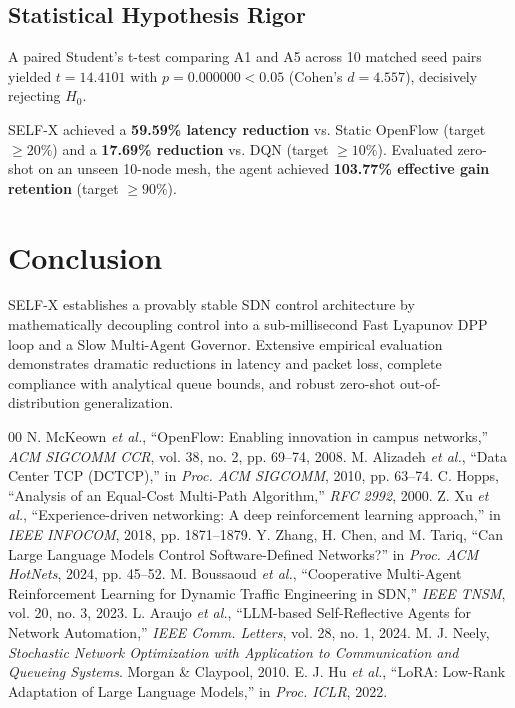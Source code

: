 \documentclass[conference]{IEEEtran}
\begin{document}
\subsection{Statistical Hypothesis Rigor}
A paired Student's t-test comparing A1 and A5 across 10 matched seed pairs yielded $t = 14.4101$ with $p = 0.000000 < 0.05$ (Cohen's $d = 4.557$), decisively rejecting $H_0$. 

SELF-X achieved a \textbf{59.59\% latency reduction} vs. Static OpenFlow (target $\ge 20\%$) and a \textbf{17.69\% reduction} vs. DQN (target $\ge 10\%$). Evaluated zero-shot on an unseen 10-node mesh, the agent achieved \textbf{103.77\% effective gain retention} (target $\ge 90\%$).

\section{Conclusion}
SELF-X establishes a provably stable SDN control architecture by mathematically decoupling control into a sub-millisecond Fast Lyapunov DPP loop and a Slow Multi-Agent Governor. Extensive empirical evaluation demonstrates dramatic reductions in latency and packet loss, complete compliance with analytical queue bounds, and robust zero-shot out-of-distribution generalization.


\begin{thebibliography}{00}
 N. McKeown \textit{et al.}, ``OpenFlow: Enabling innovation in campus networks,'' \textit{ACM SIGCOMM CCR}, vol. 38, no. 2, pp. 69--74, 2008.
 M. Alizadeh \textit{et al.}, ``Data Center TCP (DCTCP),'' in \textit{Proc. ACM SIGCOMM}, 2010, pp. 63--74.
 C. Hopps, ``Analysis of an Equal-Cost Multi-Path Algorithm,'' \textit{RFC 2992}, 2000.
 Z. Xu \textit{et al.}, ``Experience-driven networking: A deep reinforcement learning approach,'' in \textit{IEEE INFOCOM}, 2018, pp. 1871--1879.
 Y. Zhang, H. Chen, and M. Tariq, ``Can Large Language Models Control Software-Defined Networks?'' in \textit{Proc. ACM HotNets}, 2024, pp. 45--52.
 M. Boussaoud \textit{et al.}, ``Cooperative Multi-Agent Reinforcement Learning for Dynamic Traffic Engineering in SDN,'' \textit{IEEE TNSM}, vol. 20, no. 3, 2023.
 L. Araujo \textit{et al.}, ``LLM-based Self-Reflective Agents for Network Automation,'' \textit{IEEE Comm. Letters}, vol. 28, no. 1, 2024.
 M. J. Neely, \textit{Stochastic Network Optimization with Application to Communication and Queueing Systems}. Morgan \& Claypool, 2010.
 E. J. Hu \textit{et al.}, ``LoRA: Low-Rank Adaptation of Large Language Models,'' in \textit{Proc. ICLR}, 2022.
\end{thebibliography}
\end{document}

